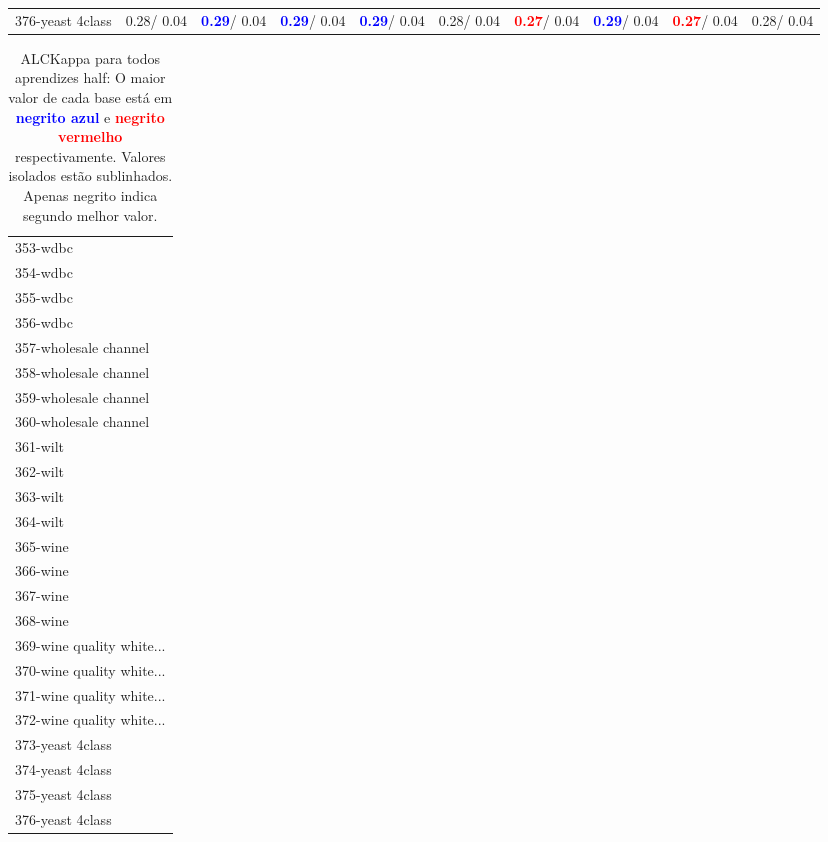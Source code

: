 \begin{table}[h]
\begin{center}
{\begin{tabular}{lc|c|c|c|c|c|c|c|c}
376-yeast 4class &   0.28/  0.04 & \textcolor{blue}{\textbf{  0.29}}/  0.04 & \textcolor{blue}{\textbf{  0.29}}/  0.04 & \textcolor{blue}{\textbf{  0.29}}/  0.04 &   0.28/  0.04 & \textcolor{red}{\textbf{  0.27}}/  0.04 & \textcolor{blue}{\textbf{  0.29}}/  0.04 & \textcolor{red}{\textbf{  0.27}}/  0.04 &   0.28/  0.04 \\\end{tabular}}\label{stratsALCKappa11AllReduxalla}
\end{center}
\end{table}
\begin{table}[h]
\caption{ALCKappa para todos aprendizes half: O maior valor de cada base está em \textcolor{blue}{\textbf{negrito azul}} e \textcolor{red}{\textbf{negrito vermelho}} respectivamente. Valores isolados estão sublinhados. Apenas negrito indica segundo melhor valor.}
\begin{center}\begin{tabular}{l}
 & \\ \hline 353-wdbc &  \\
354-wdbc &  \\
355-wdbc &  \\
356-wdbc &  \\
357-wholesale channel &  \\
358-wholesale channel &  \\
359-wholesale channel &  \\ \hline
360-wholesale channel &  \\
361-wilt &  \\
362-wilt &  \\
363-wilt &  \\
364-wilt &  \\
365-wine &  \\
366-wine &  \\ \hline
367-wine &  \\
368-wine &  \\
369-wine quality white... &  \\
370-wine quality white... &  \\
371-wine quality white... &  \\
372-wine quality white... &  \\
373-yeast 4class &  \\ \hline
374-yeast 4class &  \\
375-yeast 4class &  \\
376-yeast 4class &  \\\end{tabular}\label{stratsALCKappa11AllReduxallb}
\end{center}
\end{table}